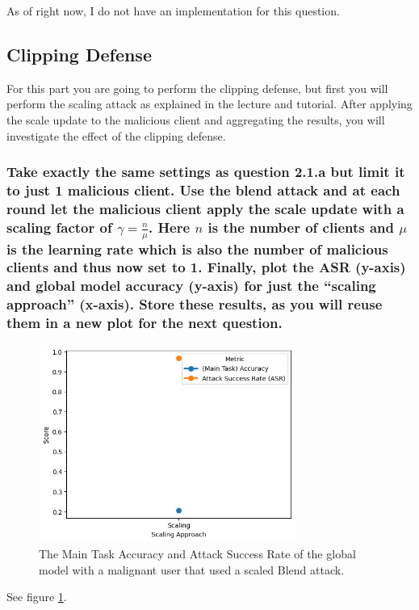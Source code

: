 \documentclass{article}
\begin{document}
As of right now, I do not have an implementation for this question.

\subsection{Clipping Defense}
For this part you are going to perform the clipping defense, but first you will perform
the scaling attack as explained in the lecture and tutorial. After applying the scale
update to the malicious client and aggregating the results, you will investigate the
effect of the clipping defense.

\subsubsection{Take exactly the same settings as question 2.1.a but limit it to just 1
malicious client. Use the blend attack and at each round let the malicious client
apply the scale update with a scaling factor of $\gamma = \frac{n}{\mu}$. Here $n$ is the number of
clients and $\mu$ is the learning rate which is also the number of malicious clients
and thus now set to 1. Finally, plot the ASR (y-axis) and global model accuracy
(y-axis) for just the “scaling approach” (x-axis). Store these results, as you will
reuse them in a new plot for the next question.}
\begin{figure}
    \centering
    \includegraphics[width=0.75\textwidth]{scaling_attack.png}
    \caption{The Main Task Accuracy and Attack Success Rate of the global model with a malignant user that used a scaled Blend attack.}
    \label{fig:scaling_attack}
\end{figure}

See figure \ref{fig:scaling_attack}.
\end{document}
